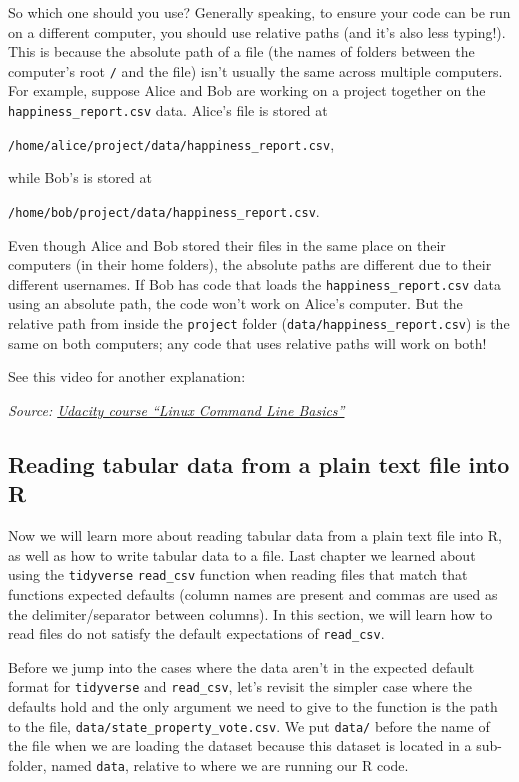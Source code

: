 \documentclass[
]{article}
\begin{document}
So which one should you use? Generally speaking, to ensure your code can
be run on a different computer, you should use relative paths (and it's
also less typing!). This is because the absolute path of a file (the
names of folders between the computer's root \texttt{/} and the file)
isn't usually the same across multiple computers. For example, suppose
Alice and Bob are working on a project together on the
\texttt{happiness\_report.csv} data. Alice's file is stored at

\texttt{/home/alice/project/data/happiness\_report.csv},

while Bob's is stored at

\texttt{/home/bob/project/data/happiness\_report.csv}.

Even though Alice and Bob stored their files in the same place on their
computers (in their home folders), the absolute paths are different due
to their different usernames. If Bob has code that loads the
\texttt{happiness\_report.csv} data using an absolute path, the code
won't work on Alice's computer. But the relative path from inside the
\texttt{project} folder (\texttt{data/happiness\_report.csv}) is the
same on both computers; any code that uses relative paths will work on
both!

See this video for another explanation:

\emph{Source:
\href{https://www.udacity.com/course/linux-command-line-basics--ud595}{Udacity
course ``Linux Command Line Basics''}}

\hypertarget{reading-tabular-data-from-a-plain-text-file-into-r}{%
\subsection{Reading tabular data from a plain text file into
R}\label{reading-tabular-data-from-a-plain-text-file-into-r}}

Now we will learn more about reading tabular data from a plain text file
into R, as well as how to write tabular data to a file. Last chapter we
learned about using the \texttt{tidyverse} \texttt{read\_csv} function
when reading files that match that functions expected defaults (column
names are present and commas are used as the delimiter/separator between
columns). In this section, we will learn how to read files do not
satisfy the default expectations of \texttt{read\_csv}.

Before we jump into the cases where the data aren't in the expected
default format for \texttt{tidyverse} and \texttt{read\_csv}, let's
revisit the simpler case where the defaults hold and the only argument
we need to give to the function is the path to the file,
\texttt{data/state\_property\_vote.csv}. We put \texttt{data/} before
the name of the file when we are loading the dataset because this
dataset is located in a sub-folder, named \texttt{data}, relative to
where we are running our R code.
\end{document}
